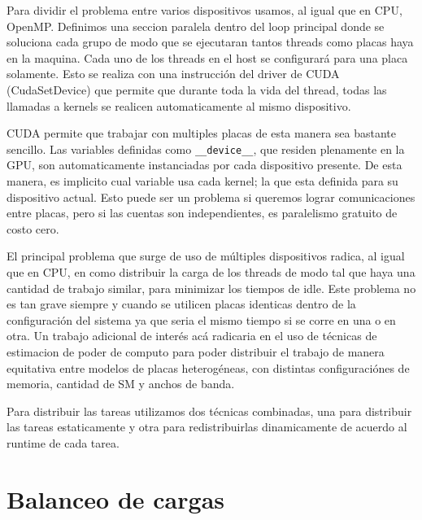Para dividir el problema entre varios dispositivos usamos, al igual que en CPU, OpenMP. Definimos
una seccion paralela dentro del loop principal donde se soluciona cada grupo de modo que se
ejecutaran tantos threads como placas haya en la maquina. Cada
uno de los threads en el host se configurar\'a para una placa solamente. Esto se realiza con
una instrucci\'on del driver de CUDA (CudaSetDevice) que permite que durante toda la vida del
thread, todas las llamadas a kernels se realicen automaticamente al mismo dispositivo.

CUDA permite que trabajar con multiples placas de esta manera sea bastante sencillo. Las variables
definidas como \texttt{\_\_device\_\_}, que residen plenamente en la GPU, son automaticamente instanciadas
por cada dispositivo presente. De esta manera, es implicito cual variable usa cada kernel; la que
esta definida para su dispositivo actual. Esto puede ser un problema si queremos lograr comunicaciones entre placas,
pero si las cuentas son independientes, es paralelismo gratuito de costo cero.

El principal problema que surge de uso de m\'ultiples dispositivos radica, al igual que en
CPU, en como distribuir la carga de los threads de modo tal que haya una cantidad de trabajo
similar, para minimizar los tiempos de idle. Este problema no es tan grave siempre y cuando
se utilicen placas identicas dentro de la configuraci\'on del sistema ya que seria
el mismo tiempo si se corre en una o en otra. Un trabajo adicional de inter\'es ac\'a
radicaria en el uso de t\'ecnicas de estimacion de poder de computo para poder
distribuir el trabajo de manera equitativa entre modelos de placas heterog\'eneas, con distintas
configuraci\'ones de memoria, cantidad de SM y anchos de banda.

Para distribuir las tareas utilizamos dos t\'ecnicas combinadas, una para distribuir las
tareas estaticamente y otra para redistribuirlas dinamicamente de acuerdo al runtime de
cada tarea.

\section{Balanceo de cargas}

